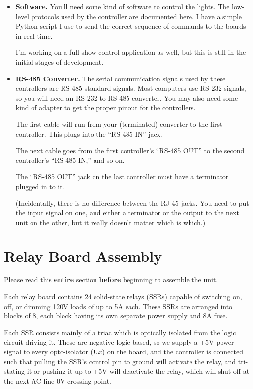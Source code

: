 \documentclass[12pt]{article}
\begin{document}
\begin{itemize}
\item
{\bf Software.}
You'll need some kind of software to control the lights.  The low-level
protocols used by the controller are documented here.  I have a simple
Python script I use to send the correct sequence of commands to the
boards in real-time.

I'm working on a full show control application as well, but this is 
still in the initial stages of development.

\item
{\bf RS-485 Converter.}
The serial communication signals used by these controllers are RS-485
standard signals.  Most computers use RS-232 signals, so you will need
an RS-232 to RS-485 converter.  You may also need some kind of adapter
to get the proper pinout for the controllers.

The first cable will run from your (terminated) converter to the first
controller.  This plugs into the ``RS-485 IN'' jack.

The next cable goes from the first controller's ``RS-485 OUT'' to the 
second controller's ``RS-485 IN,'' and so on.  

The ``RS-485 OUT'' jack on the last controller must have a terminator
plugged in to it.

(Incidentally, there is no difference between the RJ-45 jacks.  You need
to put the input signal on one, and either a terminator or the output
to the next unit on the other, but it really doesn't matter which is
which.)
\end{itemize}

\section{Relay Board Assembly}
Please read this {\bf entire} section {\bf before} beginning to assemble
the unit.

Each relay board contains 24 solid-state relays (SSRs) capable of
switching on, off, or dimming 120V loads of up to 5A each.  These SSRs
are arranged into blocks of 8, each block having its own separate power
supply and 8A fuse.

Each SSR consists mainly of a triac which is optically isolated from
the logic circuit driving it.  These are negative-logic based, so we
supply a +5V power signal to every opto-isolator (U$x$) on the board,
and the controller is connected such that pulling the SSR's control pin
to ground will activate the relay, and tri-stating it or pushing it up
to +5V will deactivate the relay, which will shut off at the next AC line
0V crossing point.
\end{document}
